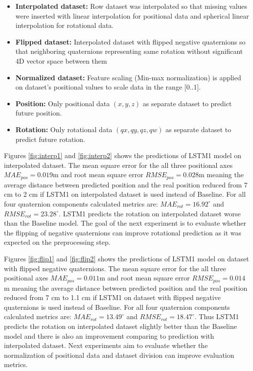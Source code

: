 \begin{itemize}
	\item \textbf{Interpolated dataset:} Row dataset was interpolated so that missing values were inserted with linear interpolation for positional data and spherical linear interpolation for rotational data. 
	\item \textbf{Flipped dataset:} Interpolated dataset with flipped negative quaternions so that neighboring quaternions representing same rotation without significant 4D vector space between them
	\item \textbf{Normalized dataset:} Feature scaling (Min-max normalization) is applied on dataset's positional values to scale data in the range [0..1]. 
	\item \textbf{Position:} Only positional data $(x, y, z)$ as separate dataset to predict future position. 
	\item \textbf{Rotation:} Only rotational data $(qx, qy, qz, qw)$ as separate dataset to predict future rotation. 
	
\end{itemize}



Figures \ref{fig:interp1} and \ref{fig:interp2} shows the predictions of LSTM1 model on interpolated dataset. The mean square error for the all three positional axes $MAE_{pos} = 0.019$m and root mean square error  $RMSE_{pos} = 0.028$m meaning the average distance between predicted position and the real position reduced from 7 cm to 2 cm if LSTM1 on interpolated dataset is used instead of Baseline. For all four quaternion components calculated metrics  are: $MAE_{rot} = 16.92^{\circ}$ and $RMSE_{rot}  =23.28^{\circ}$. LSTM1 predicts the rotation on interpolated dataset worse than the Baseline model. The goal of the next experiment is to evaluate whether the flipping of negative quaternions can improve rotational prediction as it was expected on the preprocessing step.

Figures \ref{fig:flip1} and \ref{fig:flip2} shows the predictions of LSTM1 model on dataset with flipped negative quaternions. The mean square error for the all three positional axes $MAE_{pos} = 0.011$m and root mean square error  $RMSE_{pos} = 0.014$m meaning the average distance between predicted position and the real position reduced from 7 cm to 1.1 cm if LSTM1 on dataset with flipped negative quaternions is used instead of Baseline. For all four quaternion components calculated metrics are: $MAE_{rot} = 13.49^{\circ}$ and $RMSE_{rot}  =18.47^{\circ}$. Thus LSTM1 predicts the rotation on interpolated dataset slightly better than the Baseline model and there is also an improvement comparing to prediction with interpolated dataset. Next experiments aim to evaluate whether the normalization of positional data and dataset division can improve evaluation metrics. 

